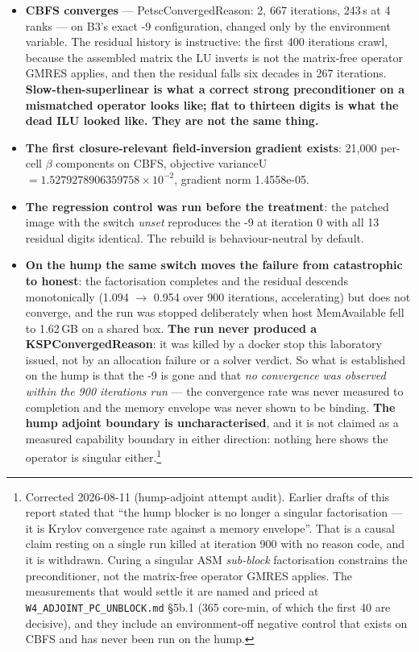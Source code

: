 \documentclass[11pt,a4paper]{article}
\newcommand{\breakus}{\textunderscore\allowbreak}
\newcommand{\code}[1]{{\small\ttfamily\let\_\breakus #1}}
\begin{document}
\begin{itemize}
\item \textbf{CBFS converges} --- \code{PetscConvergedReason: 2}, 667 iterations, 243\,s at
  4 ranks --- on B3's exact \code{-9} configuration, changed only by the environment
  variable. The residual history is instructive: the first 400 iterations crawl, because
  the assembled matrix the LU inverts is not the matrix-free operator GMRES applies, and
  then the residual falls six decades in 267 iterations. \textbf{Slow-then-superlinear is
  what a correct strong preconditioner on a mismatched operator looks like; flat to
  thirteen digits is what the dead ILU looked like. They are not the same thing.}
\item \textbf{The first closure-relevant field-inversion gradient exists}: 21{,}000
  per-cell $\beta$ components on CBFS, objective \code{varianceU} $=
  1.5279278906359758\times10^{-2}$, gradient norm 1.4558e-05.
\item \textbf{The regression control was run before the treatment}: the patched image with
  the switch \emph{unset} reproduces the \code{-9} at iteration 0 with all 13 residual
  digits identical. The rebuild is behaviour-neutral by default.
\item \textbf{On the hump the same switch moves the failure from catastrophic to honest}:
  the factorisation completes and the residual descends monotonically
  (1.094 $\rightarrow$ 0.954 over 900 iterations, accelerating) but does not converge, and
  the run was stopped deliberately when host \code{MemAvailable} fell to 1.62\,GB on a
  shared box. \textbf{The run never produced a \code{KSPConvergedReason}}: it was killed by
  a \code{docker stop} this laboratory issued, not by an allocation failure or a solver
  verdict. So what is established on the hump is that the \code{-9} is gone and that
  \emph{no convergence was observed within the 900 iterations run} --- the convergence rate
  was never measured to completion and the memory envelope was never shown to be binding.
  \textbf{The hump adjoint boundary is uncharacterised}, and it is not claimed as a measured
  capability boundary in either direction: nothing here shows the operator is singular
  either.\footnote{Corrected 2026-08-11 (hump-adjoint attempt audit). Earlier drafts of this
  report stated that ``the hump blocker is no longer a singular factorisation --- it is
  Krylov convergence rate against a memory envelope''. That is a causal claim resting on a
  single run killed at iteration 900 with no reason code, and it is withdrawn. Curing a
  singular ASM \emph{sub-block} factorisation constrains the preconditioner, not the
  matrix-free operator GMRES applies. The measurements that would settle it are named and
  priced at \texttt{W4\_ADJOINT\_PC\_UNBLOCK.md} \S5b.1 (365 core-min, of which the first
  40 are decisive), and they include an environment-off negative control that exists on
  CBFS and has never been run on the hump.}
\end{itemize}
\end{document}
